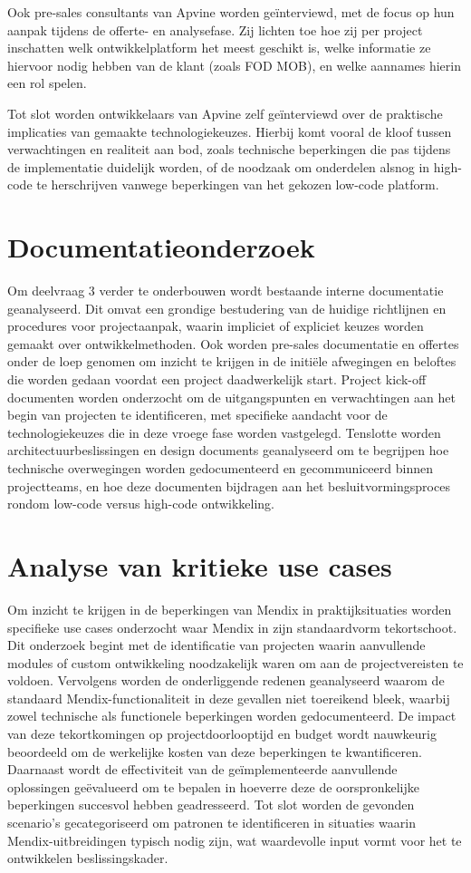 Ook pre-sales consultants van Apvine worden geïnterviewd, met de focus op hun aanpak tijdens de offerte- en analysefase. Zij lichten toe hoe zij per project inschatten welk ontwikkelplatform het meest geschikt is, welke informatie ze hiervoor nodig hebben van de klant (zoals \gls{FOD MOB}), en welke aannames hierin een rol spelen.

Tot slot worden ontwikkelaars van Apvine zelf geïnterviewd over de praktische implicaties van gemaakte technologiekeuzes. Hierbij komt vooral de kloof tussen verwachtingen en realiteit aan bod, zoals technische beperkingen die pas tijdens de implementatie duidelijk worden, of de noodzaak om onderdelen alsnog in high-code te herschrijven vanwege beperkingen van het gekozen low-code platform.


\section{Documentatieonderzoek}
Om deelvraag 3 verder te onderbouwen wordt bestaande interne documentatie geanalyseerd. Dit omvat een grondige bestudering van de huidige richtlijnen en procedures voor projectaanpak, waarin impliciet of expliciet keuzes worden gemaakt over ontwikkelmethoden. Ook worden pre-sales documentatie en offertes onder de loep genomen om inzicht te krijgen in de initiële afwegingen en beloftes die worden gedaan voordat een project daadwerkelijk start. Project kick-off documenten worden onderzocht om de uitgangspunten en verwachtingen aan het begin van projecten te identificeren, met specifieke aandacht voor de technologiekeuzes die in deze vroege fase worden vastgelegd. Tenslotte worden architectuurbeslissingen en design documents geanalyseerd om te begrijpen hoe technische overwegingen worden gedocumenteerd en gecommuniceerd binnen projectteams, en hoe deze documenten bijdragen aan het besluitvormingsproces rondom low-code versus high-code ontwikkeling.
\section{Analyse van kritieke use cases}
Om inzicht te krijgen in de beperkingen van Mendix in praktijksituaties worden specifieke use cases onderzocht waar Mendix in zijn standaardvorm tekortschoot. Dit onderzoek begint met de identificatie van projecten waarin aanvullende modules of custom ontwikkeling noodzakelijk waren om aan de projectvereisten te voldoen. Vervolgens worden de onderliggende redenen geanalyseerd waarom de standaard Mendix-functionaliteit in deze gevallen niet toereikend bleek, waarbij zowel technische als functionele beperkingen worden gedocumenteerd. De impact van deze tekortkomingen op projectdoorlooptijd en budget wordt nauwkeurig beoordeeld om de werkelijke kosten van deze beperkingen te kwantificeren. Daarnaast wordt de effectiviteit van de geïmplementeerde aanvullende oplossingen geëvalueerd om te bepalen in hoeverre deze de oorspronkelijke beperkingen succesvol hebben geadresseerd. Tot slot worden de gevonden scenario's gecategoriseerd om patronen te identificeren in situaties waarin Mendix-uitbreidingen typisch nodig zijn, wat waardevolle input vormt voor het te ontwikkelen beslissingskader.




